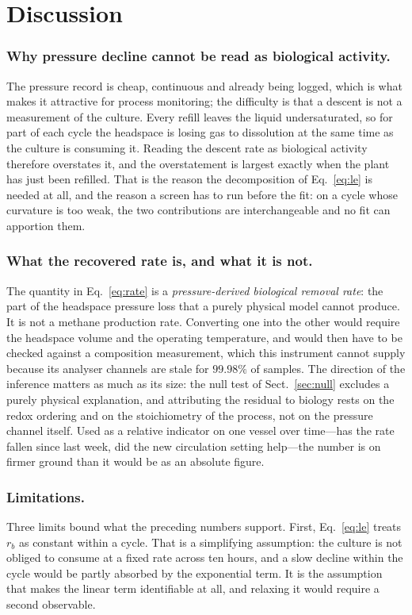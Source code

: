 \documentclass[runningheads]{llncs}
\newcommand{\rb}{\ensuremath{r_{b}}}
\begin{document}
\section{Discussion}
\label{sec:limits}

\subsubsection{Why pressure decline cannot be read as biological
activity.}
The pressure record is cheap, continuous and already being logged,
which is what makes it attractive for process monitoring; the
difficulty is that a descent is not a measurement of the culture. Every
refill leaves the liquid undersaturated, so for part of each cycle the
headspace is losing gas to dissolution at the same time as the culture
is consuming it. Reading the descent rate as biological activity
therefore overstates it, and the overstatement is largest exactly when
the plant has just been refilled. That is the reason the decomposition
of Eq.~\eqref{eq:le} is needed at all, and the reason a screen has to
run before the fit: on a cycle whose curvature is too weak, the two
contributions are interchangeable and no fit can apportion them.

\subsubsection{What the recovered rate is, and what it is not.}
The quantity in Eq.~\eqref{eq:rate} is a \emph{pressure-derived
biological removal rate}: the part of the headspace pressure loss that
a purely physical model cannot produce. It is not a methane production
rate. Converting one into the other would require the headspace volume
and the operating temperature, and would then have to be checked
against a composition measurement, which this instrument cannot supply
because its analyser channels are stale for $99.98\%$ of samples. The
direction of the inference matters as much as its size: the null test
of Sect.~\ref{sec:null} excludes a purely physical explanation, and
attributing the residual to biology rests on the redox ordering and on
the stoichiometry of the process, not on the pressure channel itself.
Used as a relative indicator on one vessel over time---has the rate
fallen since last week, did the new circulation setting help---the
number is on firmer ground than it would be as an absolute figure.

\subsubsection{Limitations.}
Three limits bound what the preceding numbers support. First,
Eq.~\eqref{eq:le} treats \rb{} as constant within a cycle. That is a
simplifying assumption: the culture is not obliged to consume at a
fixed rate across ten hours, and a slow decline within the cycle would
be partly absorbed by the exponential term. It is the assumption that
makes the linear term identifiable at all, and relaxing it would
require a second observable.
\end{document}
